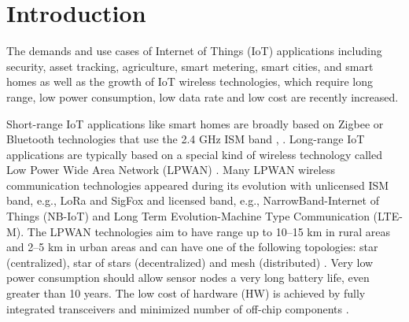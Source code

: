 \chapter{Introduction}
The demands and use cases of Internet of Things (IoT) applications including security, asset tracking, agriculture, smart metering, smart cities, and smart homes as well as the growth of IoT wireless technologies, which require long range, low power consumption, low data rate and low cost are recently increased.

Short-range IoT applications like smart homes are broadly based on Zigbee or Bluetooth technologies that use the 2.4 GHz ISM band \cite{Design and Implementation of an IoT Assisted Real Time ZigBee Mesh WSN}, \cite{Internet of Things (IoT) for building Smart Home System}.
Long-range IoT applications are typically based on a special kind of wireless technology called Low Power Wide Area Network (LPWAN) \cite{A comparative study of LPWAN technologies for large-scale IoTdeployment}. Many LPWAN wireless communication technologies appeared during its evolution with unlicensed ISM band, e.g., LoRa and SigFox and licensed band, e.g., NarrowBand-Internet of Things (NB-IoT) and Long Term Evolution-Machine Type Communication (LTE-M).
The LPWAN technologies aim to have range up to 10–15 km in rural areas and 2–5 km in urban areas \cite{Long-Range Communications in Unlicensed Bands} and can have one of the following topologies: star (centralized), star of stars (decentralized) and mesh (distributed) \cite{high density LPWAN}.
Very low power consumption should allow sensor nodes a very long battery life, even greater than 10 years.
The low cost of hardware (HW) is achieved by fully integrated transceivers and minimized number of off-chip components \cite{MURS Band for LPWAN Applications}.

